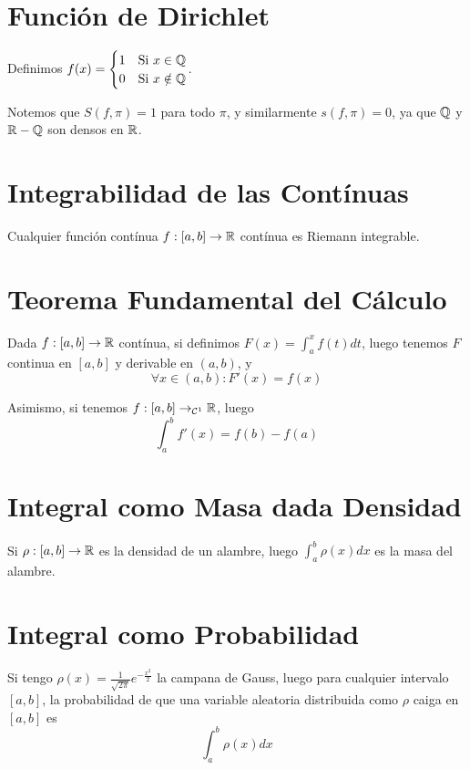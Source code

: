 \documentclass{article}
\begin{document}
	\section*{Función de Dirichlet}
	Definimos $f(x) = 
	\begin{cases}
		1 & \text{Si $x \in \mathbb{Q}$} \\
		0 & \text{Si $x \notin \mathbb{Q}$}
	\end{cases}$.

	Notemos que $S(f, \pi) = 1$ para todo $\pi$, y similarmente $s(f, \pi) = 0$, ya que $\mathbb{Q}$ y $\mathbb{R} - \mathbb{Q}$ son densos en $\mathbb{R}$.

	\section*{Integrabilidad de las Contínuas}
	Cualquier función contínua $f : [a,b] \to \mathbb{R}$ contínua es Riemann integrable.
	\section*{Teorema Fundamental del Cálculo}
	Dada $f : [a,b] \to \mathbb{R}$ contínua, si definimos $F(x) = \int_a^x f(t) dt$, luego tenemos $F$ continua en $[a,b]$ y derivable en $(a,b)$, y
	\[\forall x \in (a,b) : F'(x) = f(x)\]

	Asimismo, si tenemos $f : [a,b] \to_{\mathcal{C}^1} \mathbb{R}$, luego
	\[\int_a^b f'(x) = f(b) - f(a)\]
	\section*{Integral como Masa dada Densidad}
	Si $\rho : [a,b] \to \mathbb{R}$ es la densidad de un alambre, luego $\int_a^b \rho(x) dx$ es la masa del alambre.

	\section*{Integral como Probabilidad}
	Si tengo $\rho(x) = \frac{1}{\sqrt{2\pi}}e^{-\frac{x^2}{2}}$ la campana de Gauss, luego para cualquier intervalo $[a,b]$, la probabilidad de que una variable aleatoria distribuida como $\rho$ caiga en $[a,b]$ es
	\[\int_a^b \rho(x) dx\]
\end{document}
